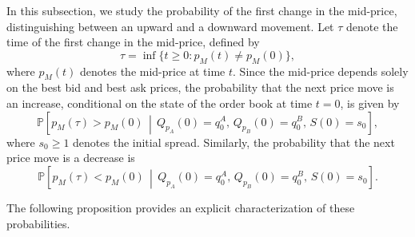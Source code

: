 \documentclass[11pt]{article}
\begin{document}
In this subsection, we study the probability of the first change in the mid-price, distinguishing between an upward and a downward movement. Let $\tau$ denote the time of the first change in the mid-price, defined by
\begin{equation*}
    \tau = \inf\{t \geq 0 : p_M(t) \neq p_M(0)\},
\end{equation*}
where $p_M(t)$ denotes the mid-price at time $t$. Since the mid-price depends solely on the best bid and best ask prices, the probability that the next price move is an increase, conditional on the state of the order book at time $t=0$, is given by
\begin{equation}\label{pricemoveprob}
    \mathbb{P}\left[p_M(\tau) > p_M(0) \,\middle|\, Q_{p_A}(0) = q_0^A,\, Q_{p_B}(0) = q_0^B,\, S(0) = s_0\right],
\end{equation}
where $s_0 \geq 1$ denotes the initial spread.  
Similarly, the probability that the next price move is a decrease is
\begin{equation}\label{pricemoveprob2}
    \mathbb{P}\left[p_M(\tau) < p_M(0) \,\middle|\, Q_{p_A}(0) = q_0^A,\, Q_{p_B}(0) = q_0^B,\, S(0) = s_0\right].
\end{equation}



The following proposition provides an explicit characterization of these probabilities.
\end{document}

